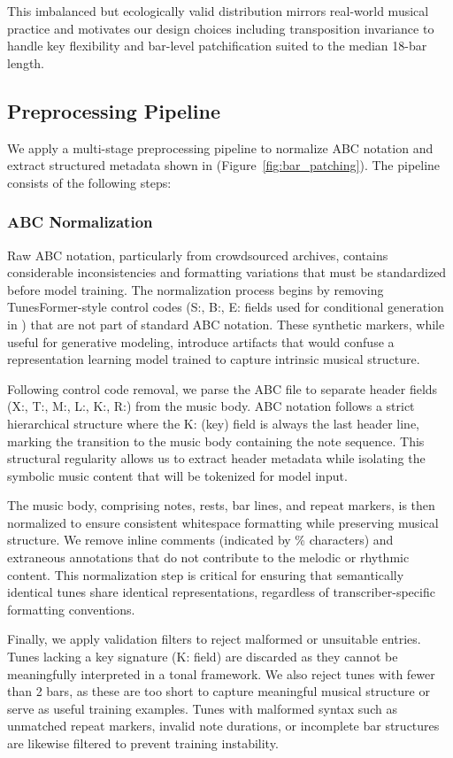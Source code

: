 \documentclass[]{interact}
\theoremstyle{plain}
\theoremstyle{definition}
\theoremstyle{remark}
\begin{document}
This imbalanced but ecologically valid distribution mirrors real-world musical practice and motivates our design choices including transposition invariance to handle key flexibility and bar-level patchification suited to the median 18-bar length.

\subsection{Preprocessing Pipeline}
We apply a multi-stage preprocessing pipeline to normalize ABC notation and extract structured metadata shown in (Figure~\ref{fig:bar_patching}). The pipeline consists of the following steps:

\subsubsection{ABC Normalization}
Raw ABC notation, particularly from crowdsourced archives, contains considerable inconsistencies and formatting variations that must be standardized before model training. The normalization process begins by removing TunesFormer-style control codes (S:, B:, E: fields used for conditional generation in \cite{wu2023tunesformer}) that are not part of standard ABC notation. These synthetic markers, while useful for generative modeling, introduce artifacts that would confuse a representation learning model trained to capture intrinsic musical structure.

Following control code removal, we parse the ABC file to separate header fields (X:, T:, M:, L:, K:, R:) from the music body. ABC notation follows a strict hierarchical structure where the K: (key) field is always the last header line, marking the transition to the music body containing the note sequence. This structural regularity allows us to extract header metadata while isolating the symbolic music content that will be tokenized for model input.

The music body, comprising notes, rests, bar lines, and repeat markers, is then normalized to ensure consistent whitespace formatting while preserving musical structure. We remove inline comments (indicated by \% characters) and extraneous annotations that do not contribute to the melodic or rhythmic content. This normalization step is critical for ensuring that semantically identical tunes share identical representations, regardless of transcriber-specific formatting conventions.

Finally, we apply validation filters to reject malformed or unsuitable entries. Tunes lacking a key signature (K: field) are discarded as they cannot be meaningfully interpreted in a tonal framework. We also reject tunes with fewer than 2 bars, as these are too short to capture meaningful musical structure or serve as useful training examples. Tunes with malformed syntax such as unmatched repeat markers, invalid note durations, or incomplete bar structures are likewise filtered to prevent training instability.
\end{document}
